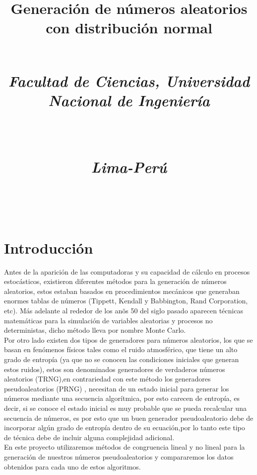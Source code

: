 \documentclass[conference]{IEEEtran}
\begin{document}
\title{Generaci\'on de n\'umeros aleatorios con distribuci\'on normal\\
\\
\centerline{\textit{Facultad de Ciencias, Universidad Nacional de Ingenier\'ia}}\\
\centerline{\textit{Lima-Per\'u}}\\
\author{}
}
\maketitle
\begin{abstract}
\end{abstract}
\begin{IEEEkeywords}
\end{IEEEkeywords}

\section{Introducci\'on}
Antes de la aparici\'on de las computadoras y su capacidad de c\'alculo en procesos estoc\'asticos, existieron diferentes m\'etodos para la generaci\'on de n\'umeros aleatorios, estos estaban basados en procedimientos mec\'anicos que generaban enormes tablas de n\'umeros (Tippett, Kendall y Babbington, Rand Corporation, etc). M\'as adelante al rededor de los an\~os 50 del siglo pasado aparecen t\'ecnicas matem\'aticas para la simulaci\'on de variables aleatorias y procesos no deterministas, dicho m\'etodo lleva por nombre Monte Carlo.\\
Por otro lado existen dos tipos de generadores para n\'umeros aleatorios, los que se basan en fen\'omenos f\'isicos tales como el ruido atmosf\'erico, que tiene un alto grado de entrop\'ia (ya que no se conocen las condiciones iniciales que generan estos ruidos), estos son denominados generadores de verdaderos n\'umeros aleatorios (TRNG),en contrariedad con este m\'etodo los generadores pseudoaleatorios (PRNG) \cite{b1}, necesitan de un estado inicial para generar los n\'umeros mediante una secuencia algor\'itmica, por esto carecen de entrop\'ia, es decir, si se conoce el estado inicial es muy probable que se pueda recalcular una secuencia de n\'umeros, es por esto que un buen generador pseudoaleatorio debe de incorporar alg\'un grado de entrop\'ia dentro de su ecuaci\'on,por lo tanto este tipo de t\'ecnica debe de incluir alguna complejidad adicional.\\
En este proyecto utilizaremos m\'etodos de congruencia lineal y no lineal\cite{b2} para la generaci\'on de nuestros n\'umeros pseudoaleatorios y compararemos los datos obtenidos para cada uno de estos algoritmos.
\end{document}
